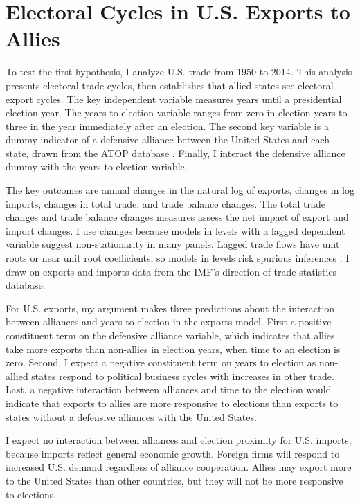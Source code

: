 \documentclass[12pt]{article}
\begin{document}
\section{Electoral Cycles in U.S. Exports to Allies}

To test the first hypothesis, I analyze U.S. trade from 1950 to 2014. 
This analysis presents electoral trade cycles, then establishes that allied states see electoral export cycles.
The key independent variable measures years until a presidential election year.
The years to election variable ranges from zero in election years to three in the year immediately after an election. 
The second key variable is a dummy indicator of a defensive alliance between the United States and each state, drawn from the ATOP database \citep{Leedsetal2002}.
Finally, I interact the defensive alliance dummy with the years to election variable.


The key outcomes are annual changes in the natural log of exports, changes in log imports, changes in total trade, and trade balance changes.
The total trade changes and trade balance changes measures assess the net impact of export and import changes.
I use changes because models in levels with a lagged dependent variable suggest non-stationarity in many panels. 
Lagged trade flows have unit roots or near unit root coefficients, so models in levels risk spurious inferences \citep{GrangerNewbold1974}.
I draw on exports and imports data from the IMF's direction of trade statistics database.


For U.S. exports, my argument makes three predictions about the interaction between alliances and years to election in the exports model. 
First a positive constituent term on the defensive alliance variable, which indicates that allies take more exports than non-allies in election years, when time to an election is zero.
Second, I expect a negative constituent term on years to election as non-allied states respond to political business cycles with increases in other trade. 
Last, a negative interaction between alliances and time to the election would indicate that exports to allies are more responsive to elections than exports to states without a defensive alliances with the United States.


I expect no interaction between alliances and election proximity for U.S. imports, because imports reflect general economic growth.
Foreign firms will respond to increased U.S. demand regardless of alliance cooperation.  
Allies may export more to the United States than other countries, but they will not be more responsive to elections.
\end{document}
